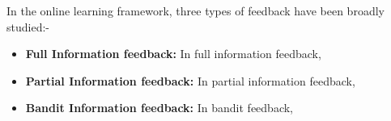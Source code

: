 In the online learning framework, three types of feedback have been broadly studied:-

\begin{itemize}
\item \textbf{Full Information feedback: } In full information feedback, 
\item \textbf{Partial Information feedback: } In partial information feedback, 
\item \textbf{Bandit Information feedback: } In bandit feedback,
\end{itemize}  